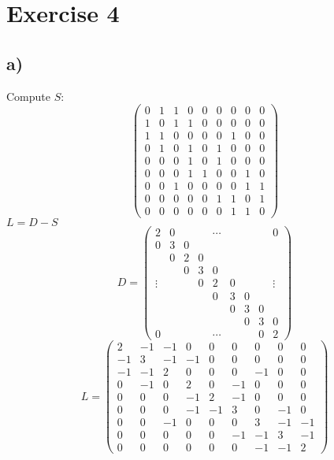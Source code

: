 \section*{Exercise 4}
\subsection*{a)}
Compute $S$: 
\[\left(\begin{matrix}
0&1&1&0&0&0&0&0&0\\1&0&1&1&0&0&0&0&0\\1&1&0&0&0&0&1&0&0\\
0&1&0&1&0&1&0&0&0\\0&0&0&1&0&1&0&0&0\\
0&0&0&1&1&0&0&1&0\\0&0&1&0&0&0&0&1&1\\0&0&0&0&0&1&1&0&1\\
0&0&0&0&0&0&1&1&0
\end{matrix}\right)\]
$L=D-S$
\[D=\left(\begin{matrix}
2&0&&&\cdots&&&&0\\
0&3&0\\&0&2&0\\&&0&3&0\\\vdots&&&0&2&0&&&\vdots\\&&&&0&3&0\\&&&&&0&3&0\\&&&&&&0&3&0\\0&&&&\cdots&&&0&2
\end{matrix}\right)\]
\[L=\left(\begin{matrix}
2&-1&-1&0&0&0&0&0&0\\-1&3&-1&-1&0&0&0&0&0\\-1&-1&2&0&0&0&-1&0&0\\
0&-1&0&2&0&-1&0&0&0\\0&0&0&-1&2&-1&0&0&0\\
0&0&0&-1&-1&3&0&-1&0\\0&0&-1&0&0&0&3&-1&-1\\0&0&0&0&0&-1&-1&3&-1\\
0&0&0&0&0&0&-1&-1&2
\end{matrix}\right)\]
